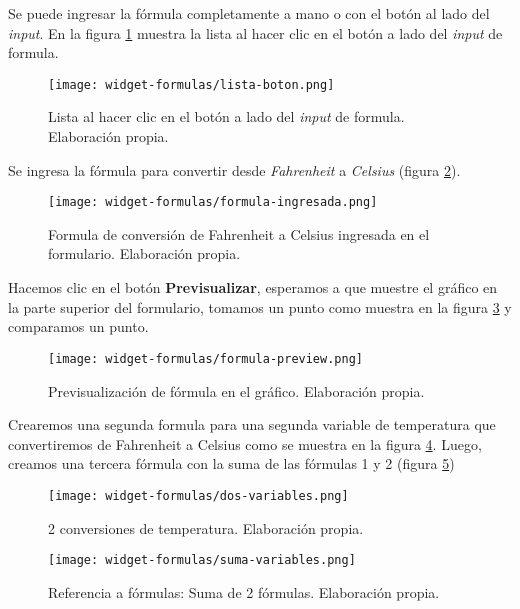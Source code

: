 Se puede ingresar la fórmula completamente a mano o con el botón al lado del \textit{input}. En la figura \ref{fig:lista-boton} muestra la lista al hacer clic en el botón a lado del \textit{input} de formula.
\iffalse lista de boton \fi
\begin{figure}[H]
	\centering
	\texttt{[image: widget-formulas/lista-boton.png]}
	\caption{\label{fig:lista-boton} Lista al hacer clic en el botón a lado del \textit{input} de formula. Elaboración propia.}
\end{figure}

Se ingresa la fórmula para convertir desde \textit{Fahrenheit} a \textit{Celsius} (figura \ref{fig:formula-ingresada}).
\iffalse formula \fi
\begin{figure}[H]
	\centering
	\texttt{[image: widget-formulas/formula-ingresada.png]}
	\caption{\label{fig:formula-ingresada} Formula de conversión de Fahrenheit a Celsius ingresada en el formulario. Elaboración propia.}
\end{figure}

Hacemos clic en el botón \textbf{Previsualizar}, esperamos a que muestre el gráfico en la parte superior del formulario, tomamos un punto como muestra en la figura \ref{fig:formula-preview} y comparamos un punto.
\iffalse formula previsualizada \fi
\iffalse formula con punto seleccionado \fi
\begin{figure}[H]
	\centering
	\texttt{[image: widget-formulas/formula-preview.png]}
	\caption{\label{fig:formula-preview} Previsualización de fórmula en el gráfico. Elaboración propia.}
\end{figure}

\iffalse agregar referencia a formulas \fi
Crearemos una segunda formula para una segunda variable de temperatura que convertiremos de Fahrenheit a Celsius como se muestra en la figura \ref{fig:dos-variables}. Luego, creamos una tercera fórmula con la suma de las fórmulas 1 y 2 (figura \ref{fig:suma-variables})
\begin{figure}[H]
	\centering
	\texttt{[image: widget-formulas/dos-variables.png]}
	\caption{\label{fig:dos-variables} 2 conversiones de temperatura. Elaboración propia.}
\end{figure}

\begin{figure}[H]
	\centering
	\texttt{[image: widget-formulas/suma-variables.png]}
	\caption{\label{fig:suma-variables} Referencia a fórmulas: Suma de 2 fórmulas. Elaboración propia.}
\end{figure}

